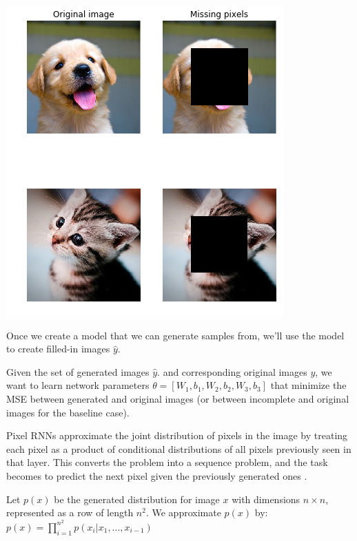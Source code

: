 \documentclass[10pt,twocolumn,letterpaper]{article}
\begin{document}
\includegraphics[width=1.0\linewidth]{img_sample.png}

Once we create a model that we can generate samples from, we'll use the model to create filled-in images $\hat{y}$.

Given the set of generated images $\hat{y}$. and corresponding original images $y$, we want to learn network parameters  $ \theta = [W_1, b_1, W_2, b_2, W_3, b_3]$ that minimize the MSE between generated and original images (or between incomplete and original images for the baseline case). 



Pixel RNNs approximate the joint distribution of pixels in the image by treating each pixel as a product of conditional distributions of all pixels previously seen in that layer.  This converts the problem into a sequence problem, and the task becomes to predict the next pixel given the previously generated ones \cite{pixelRNN}. 

Let $p(x)$ be the generated distribution for image $x$ with dimensions $n \times n$, represented as a row of length $n^2$. We approximate $p(x)$ by: \\
$p(x) = \prod_{i=1}^{n^2} p(x_i | x_1, ... , x_{i-1} )$
\end{document}
